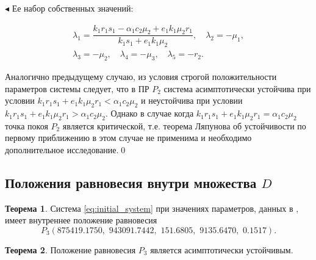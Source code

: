 \documentclass[12pt,a4paper]{extarticle}
\renewenvironment{proof}{\noindent$\blacktriangleleft$}{}
\theoremstyle{definition}
\newtheorem{theorem}{Теорема}
\theoremstyle{definition}
\theoremstyle{definition}
\begin{document}
\begin{proof}
		Ее набор собственных значений:
		
		\begin{multline*}
		\lambda_1=\dfrac{k_1r_1s_1 - \alpha_1c_2\mu_2 + e_1k_1\mu_2r_1}{k_1s_1 + e_1k_1\mu_2},\quad \lambda_2=-\mu_1,\\
		\lambda_3=-\mu_2,\quad \lambda_4=-\mu_3,\quad \lambda_5=-r_2.
		\end{multline*}
		
		Аналогично предыдущему случаю, из условия строгой положительности параметров системы следует, что в ПР $P_2$ система асимптотически устойчива при условии $k_1r_1s_1 + e_1k_1\mu_2r_1< \alpha_1c_2\mu_2$ и неустойчива при условии $k_1r_1s_1 + e_1k_1\mu_2r_1>\alpha_1c_2\mu_2$. Однако в случае когда $k_1r_1s_1 + e_1k_1\mu_2r_1=\alpha_1c_2\mu_2$ точка покоя $P_2$ является критической, т.е. теорема Ляпунова об устойчивости по первому приближению в этом случае не применима и необходимо дополнительное исследование.\qed
	\end{proof}
	
	\subsection{Положения равновесия внутри множества $D$}
	
	\begin{theorem}
		Система \ref{eq:initial_system} при значениях параметров, данных в \cite{model}, имеет внутреннее положение равновесия
		\[P_3\left(875419.1750,\,\,943091.7442,\,\,151.6805,\,\,9135.6470,\,\,0.1517\right).\] 
	\end{theorem}
	
	\begin{theorem}
		Положение равновесия $P_3$ является асимптотически устойчивым. 
	\end{theorem}
	
\end{document}
